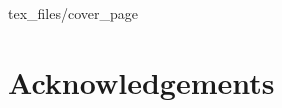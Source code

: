 \documentclass{article}
\begin{document}
 {tex_files/cover_page}

\newpage
\section*{Acknowledgements}

\medskip


\newpage
\tableofcontents
\end{document}
